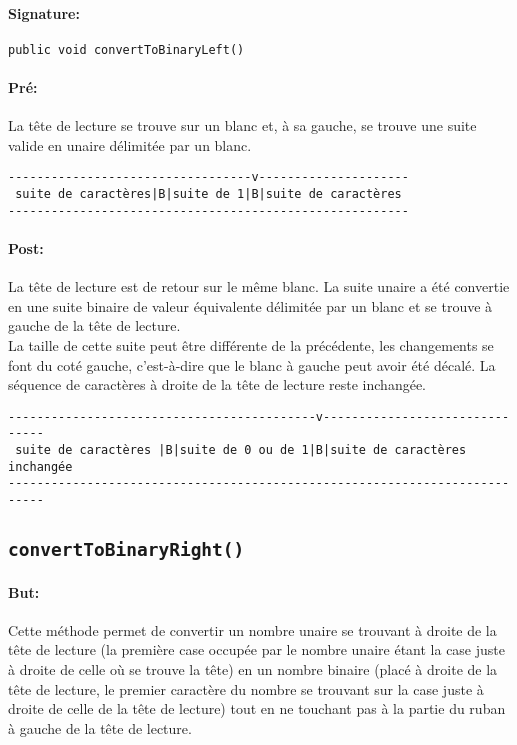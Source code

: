 \documentclass[a4paper,11pt]{article}
\begin{document}
\paragraph{Signature:} \texttt{public void convertToBinaryLeft()}
\paragraph{Pré:}
La tête de lecture se trouve sur un blanc et, à sa gauche, se trouve une suite valide en unaire délimitée par un blanc.
\begin{verbatim}
----------------------------------v---------------------
 suite de caractères|B|suite de 1|B|suite de caractères
--------------------------------------------------------
\end{verbatim}
\paragraph{Post:}
La tête de lecture est de retour sur le même blanc. La suite unaire a été convertie en une suite binaire de valeur équivalente délimitée par un blanc et se trouve à gauche de la tête de lecture.\\
La taille de cette suite peut être différente de la précédente, les changements se font du coté gauche, c'est-à-dire que le blanc à gauche peut avoir été décalé. La séquence de caractères à droite de la tête de lecture reste inchangée.
\begin{verbatim}
-------------------------------------------v-------------------------------
 suite de caractères |B|suite de 0 ou de 1|B|suite de caractères inchangée
---------------------------------------------------------------------------
\end{verbatim}
\subsection{\texttt{convertToBinaryRight()}}
\paragraph{But:} Cette méthode permet de convertir un nombre unaire se trouvant à droite de la tête de lecture (la première case occupée par le nombre unaire étant la case juste à droite de celle où se trouve la tête) en un nombre binaire (placé à droite de la tête de lecture, le premier caractère du nombre se trouvant sur la case juste à droite de celle de la tête de lecture) tout en ne touchant pas à la partie du ruban à gauche de la tête de lecture.
\end{document}
